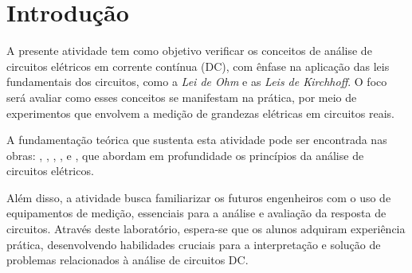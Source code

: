 \section{Introdução}

A presente atividade tem como objetivo verificar os conceitos de análise de
circuitos elétricos em corrente contínua (DC), com ênfase na aplicação das leis
fundamentais dos circuitos, como a \textit{Lei de Ohm} e as \textit{Leis de
Kirchhoff}. O foco será avaliar como esses conceitos se manifestam na prática,
por meio de experimentos que envolvem a medição de grandezas elétricas em
circuitos reais.

A fundamentação teórica que sustenta esta atividade pode ser encontrada nas obras:  \cite{alexander2008},  \cite{hayt2008},
 \cite{boylestad2012},  \cite{svoboda2016},
 \cite{nilsson2016} e  \cite{irwin2000},
que abordam em profundidade os princípios da análise de circuitos elétricos.

Além disso, a atividade busca familiarizar os futuros engenheiros com o uso de
equipamentos de medição, essenciais para a análise e avaliação da resposta de
circuitos. Através deste laboratório, espera-se que os alunos adquiram
experiência prática, desenvolvendo habilidades cruciais para a interpretação e
solução de problemas relacionados à análise de circuitos DC.
